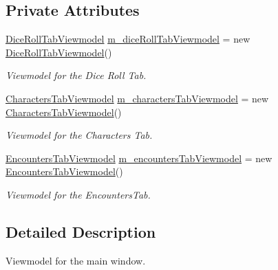 \subsection*{Private Attributes}
\begin{DoxyCompactItemize}
\item 
\mbox{\hyperlink{class_dungeons__n___dragons___manager_1_1_viewmodels_1_1_dice_roll_tab_viewmodel}{Dice\+Roll\+Tab\+Viewmodel}} \mbox{\hyperlink{class_dungeons__n___dragons___manager_1_1_viewmodels_1_1_main_window_viewmodel_a21dca87c3ce7926c5389c4954bd82e2e}{m\+\_\+dice\+Roll\+Tab\+Viewmodel}} = new \mbox{\hyperlink{class_dungeons__n___dragons___manager_1_1_viewmodels_1_1_dice_roll_tab_viewmodel}{Dice\+Roll\+Tab\+Viewmodel}}()
\begin{DoxyCompactList}\small\item\em Viewmodel for the Dice Roll Tab. \end{DoxyCompactList}\item 
\mbox{\hyperlink{class_dungeons__n___dragons___manager_1_1_viewmodels_1_1_characters_tab_viewmodel}{Characters\+Tab\+Viewmodel}} \mbox{\hyperlink{class_dungeons__n___dragons___manager_1_1_viewmodels_1_1_main_window_viewmodel_a739b87d33f7d9a28ab6a3c0ec4f7d82b}{m\+\_\+characters\+Tab\+Viewmodel}} = new \mbox{\hyperlink{class_dungeons__n___dragons___manager_1_1_viewmodels_1_1_characters_tab_viewmodel}{Characters\+Tab\+Viewmodel}}()
\begin{DoxyCompactList}\small\item\em Viewmodel for the Characters Tab. \end{DoxyCompactList}\item 
\mbox{\hyperlink{class_dungeons__n___dragons___manager_1_1_viewmodels_1_1_encounters_tab_viewmodel}{Encounters\+Tab\+Viewmodel}} \mbox{\hyperlink{class_dungeons__n___dragons___manager_1_1_viewmodels_1_1_main_window_viewmodel_a81376780a92429cfa6e1d10ed7747f5d}{m\+\_\+encounters\+Tab\+Viewmodel}} = new \mbox{\hyperlink{class_dungeons__n___dragons___manager_1_1_viewmodels_1_1_encounters_tab_viewmodel}{Encounters\+Tab\+Viewmodel}}()
\begin{DoxyCompactList}\small\item\em Viewmodel for the Encounters\+Tab. \end{DoxyCompactList}\end{DoxyCompactItemize}


\subsection{Detailed Description}
Viewmodel for the main window. 



